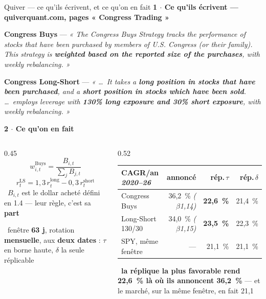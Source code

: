 \documentclass[11pt,aspectratio=169]{beamer}
\newcommand{\et}[2]{{\color{bleu}\bfseries #1 $\cdot$ #2}\par\vspace{0.6mm}}
\newcommand{\obs}[1]{{\color{bleu}\scriptsize\textbullet}~{\scriptsize #1}\par\vspace{0.4mm}}
\begin{document}
\begin{frame}{Quiver --- ce qu'ils écrivent, et ce qu'on en fait}
  \et{1}{Ce qu'ils écrivent --- quiverquant.com, pages « Congress Trading »}
  {\scriptsize
   \textbf{Congress Buys} --- \emph{« The Congress Buys Strategy tracks the performance of stocks
   that have been purchased by members of U.S. Congress (or their family). This strategy is
   \textbf{weighted based on the reported size of the purchases}, with weekly rebalancing. »}
   \par\vspace{1mm}
   \textbf{Congress Long-Short} --- \emph{« \ldots\ It takes a \textbf{long position in stocks that
   have been purchased}, and a \textbf{short position in stocks which have been sold}. \ldots\
   employs leverage with \textbf{130\% long exposure and 30\% short exposure}, with weekly
   rebalancing. »}}
  \par\vspace{0.5mm}
  \et{2}{Ce qu'on en fait}
  \begin{columns}[T]
    \begin{column}{0.45\textwidth}
      {\footnotesize\[ w^{\text{Buys}}_{i,t} = \frac{B_{i,t}}{\sum_j B_{j,t}} \]}
      \vspace{-2mm}
      {\footnotesize\[ r^{\text{LS}}_t = 1{,}3\,r^{\text{long}}_t - 0{,}3\,r^{\text{short}}_t \]}
      \vspace{-1mm}
      \obs{$B_{i,t}$ est le dollar acheté défini en 1.4 --- leur règle, c'est sa \textbf{part}}
      \obs{fenêtre \textbf{63 j}, rotation \textbf{mensuelle}, aux \textbf{deux dates} : $\tau$ en
       borne haute, $\delta$ la seule réplicable}
    \end{column}
    \begin{column}{0.52\textwidth}
      {\scriptsize\setlength{\tabcolsep}{4pt}\setlength{\extrarowheight}{2pt}
      \begin{tabular}{@{}l r r r@{}}
        \toprule
        CAGR/an \emph{2020--26} & annoncé & rép.\,$\tau$ & rép.\,$\delta$\\
        \midrule
        Congress Buys & 36,2~\% \emph{($\beta$1,14)} & \textbf{22,6~\%} & 21,4~\%\\
        Long-Short 130/30 & 34,0~\% \emph{($\beta$1,15)} & \textbf{23,5~\%} & 22,3~\%\\
        SPY, même fenêtre & --- & 21,1~\% & 21,1~\%\\
        \bottomrule
      \end{tabular}}
      \par\vspace{1.5mm}
      \obs{\textbf{la réplique la plus favorable rend 22,6~\% là où ils annoncent 36,2~\%} --- et
       le marché, sur la même fenêtre, en fait 21,1}
    \end{column}
  \end{columns}
\end{frame}
\end{document}
